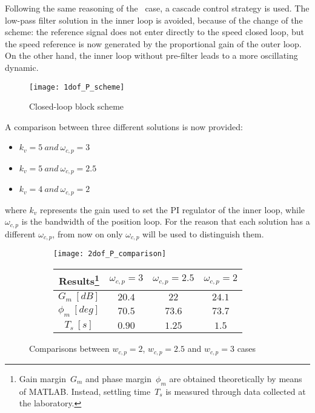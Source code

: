 Following the same reasoning of the \onedof~case, a cascade control strategy is used. The low-pass filter solution in the inner loop is avoided, because of the change of the scheme: the reference signal does not enter directly to the speed closed loop, but the speed reference is now generated by the proportional gain of the outer loop. On the other hand, the inner loop without pre-filter leads to a more oscillating dynamic. 

\begin{figure*}[h]
	\centering
	\texttt{[image: 1dof\_P\_scheme]}
	\label{fig:Closed-loop block scheme2}
	\caption{Closed-loop block scheme}
\end{figure*}

A comparison between three different solutions is now provided:
\begin{itemize}
	\item $k_v=5 \ and\  \omega_{c,p}=3$
	\item $k_v=5 \  and\ \omega_{c,p}=2.5$
	\item $k_v=4 \ and\ \omega_{c,p}=2$
\end{itemize}

where $k_v$ represents the gain used to set the PI regulator of the inner loop, while $\omega_{c,p}$ is the bandwidth of the position loop. For the reason that each solution has a different $\omega_{c,p}$, from now on only $\omega_{c,p}$ will be used to distinguish them.

\begin{figure*}[h]
	\centering
	\begin{subfigure}{0.4\columnwidth}
		\texttt{[image: 2dof\_P\_comparison]}
		\label{fig:P2dof_step}
	\end{subfigure}
	\begin{subfigure}{0.4\columnwidth}
		\begin{tabular}{|c|ccc|}
			\hline
			Results\footnote{Gain margin~$G_m$ and phase margin~$\phi_m$ are obtained theoretically by means of MATLAB. Instead, settling time~$T_s$ is measured through data collected at the laboratory.} & $\omega_{c,p}=3$ & $\omega_{c,p}=2.5$ & $\omega_{c,p}=2$ \\
			\hline
			$G_m\ [dB]$ & $20.4$ & $22$ & $24.1$ \\
			$\phi_m\ [deg]$ & $70.5$ & $73.6$ & $73.7$ \\
			\hline
			$T_s\ [s]$ & $0.90$ & $1.25$ & $1.5$ \\
			\hline
		\end{tabular}
	\end{subfigure}
	\caption{Comparisons between $w_{c,p}=2$, $w_{c,p}=2.5$ and $w_{c,p}=3$ cases}
	\label{fig:Bode and Step P 2dof comparison}
\end{figure*}

